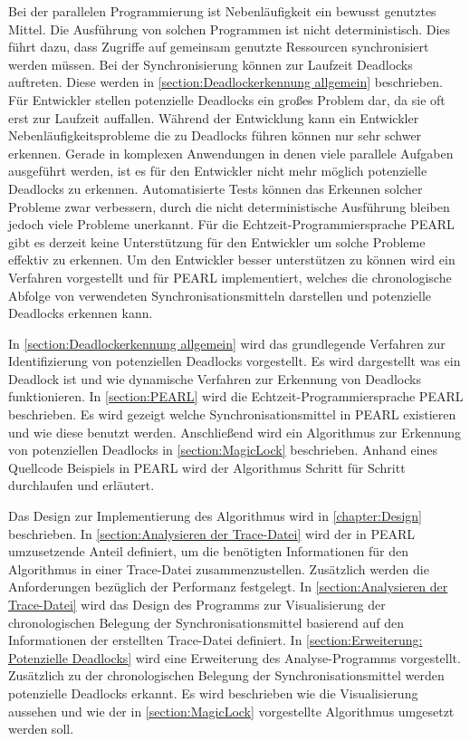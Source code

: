 Bei der parallelen Programmierung ist Nebenläufigkeit ein bewusst genutztes Mittel. Die Ausführung von solchen Programmen ist nicht deterministisch. Dies führt dazu, dass Zugriffe auf gemeinsam genutzte Ressourcen synchronisiert werden müssen. Bei der Synchronisierung können zur Laufzeit Deadlocks auftreten. Diese werden in \cref{section:Deadlockerkennung allgemein} beschrieben. Für Entwickler stellen potenzielle Deadlocks ein großes Problem dar, da sie oft erst zur Laufzeit auffallen. Während der Entwicklung kann ein Entwickler Nebenläufigkeitsprobleme die zu Deadlocks führen können nur sehr schwer erkennen. Gerade in komplexen Anwendungen in denen viele parallele Aufgaben ausgeführt werden, ist es für den Entwickler nicht mehr möglich potenzielle Deadlocks zu erkennen. Automatisierte Tests können das Erkennen solcher Probleme zwar verbessern, durch die nicht deterministische Ausführung bleiben jedoch viele Probleme unerkannt. Für die Echtzeit-Programmiersprache PEARL gibt es derzeit keine Unterstützung für den Entwickler um solche Probleme effektiv zu erkennen. Um den Entwickler besser unterstützen zu können wird ein Verfahren vorgestellt und für PEARL implementiert, welches die chronologische Abfolge von verwendeten Synchronisationsmitteln darstellen und potenzielle Deadlocks erkennen kann.

In \cref{section:Deadlockerkennung allgemein} wird das grundlegende Verfahren zur Identifizierung von potenziellen Deadlocks vorgestellt. Es wird dargestellt was ein Deadlock ist und wie dynamische Verfahren zur Erkennung von Deadlocks funktionieren. In \cref{section:PEARL} wird die Echtzeit-Programmiersprache PEARL \autocite{PEARL} beschrieben. Es wird gezeigt welche Synchronisationsmittel in PEARL existieren und wie diese benutzt werden. Anschließend wird ein Algorithmus zur Erkennung von potenziellen Deadlocks in \cref{section:MagicLock} beschrieben. Anhand eines Quellcode Beispiels in PEARL wird der Algorithmus Schritt für Schritt durchlaufen und erläutert. 

Das Design zur Implementierung des Algorithmus wird in \cref{chapter:Design} beschrieben. In \cref{section:Analysieren der Trace-Datei} wird der in PEARL umzusetzende Anteil definiert, um die benötigten Informationen für den Algorithmus in einer Trace-Datei zusammenzustellen. Zusätzlich werden die Anforderungen bezüglich der Performanz festgelegt. In \cref{section:Analysieren der Trace-Datei} wird das Design des Programms zur Visualisierung der chronologischen Belegung der Synchronisationsmittel basierend auf den Informationen der erstellten Trace-Datei definiert. In \cref{section:Erweiterung: Potenzielle Deadlocks} wird eine Erweiterung des Analyse-Programms vorgestellt. Zusätzlich zu der chronologischen Belegung der Synchronisationsmittel werden potenzielle Deadlocks erkannt. Es wird beschrieben wie die Visualisierung aussehen und wie der in \cref{section:MagicLock} vorgestellte Algorithmus umgesetzt werden soll.

